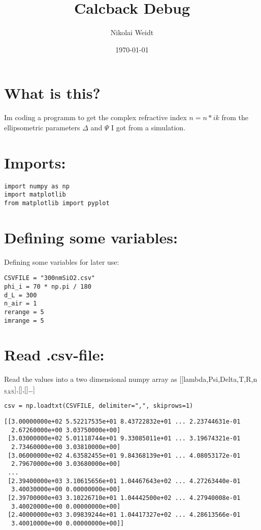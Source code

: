 \documentclass[11pt]{article}
\author{Nikolai Weidt}
\date{\today}
\title{Calcback Debug}
\begin{document}
\maketitle
\tableofcontents


\section{What is this?}
\label{sec:org780831c}
Im coding a programm to get the complex refractive index \(n = n * ik\) from the ellipsometric parameters \(\Delta\) and \(\Psi\) I got from a simulation.
\section{Imports:}
\label{sec:orgbf785b2}
\begin{verbatim}
import numpy as np
import matplotlib
from matplotlib import pyplot
\end{verbatim}

\section{Defining some variables:}
\label{sec:org04ef2e2}
Defining some variables for later use:

\begin{verbatim}
CSVFILE = "300nmSiO2.csv"
phi_i = 70 * np.pi / 180
d_L = 300
n_air = 1
rerange = 5
imrange = 5
\end{verbatim}

\section{Read .csv-file:}
\label{sec:org3476096}
Read the values into a two dimensional numpy array as [[lambda,Psi,Delta,T,R,n\(_{\text{S,k}}\)\(_{\text{S}}\)],[],[]\ldots{}]

\begin{verbatim}
csv = np.loadtxt(CSVFILE, delimiter=",", skiprows=1)
\end{verbatim}

\begin{verbatim}
[[3.00000000e+02 5.52217535e+01 8.43722832e+01 ... 2.23744631e-01
  2.67260000e+00 3.03750000e+00]
 [3.03000000e+02 5.01118744e+01 9.33085011e+01 ... 3.19674321e-01
  2.73460000e+00 3.03810000e+00]
 [3.06000000e+02 4.63582455e+01 9.84368139e+01 ... 4.08053172e-01
  2.79670000e+00 3.03680000e+00]
 ...
 [2.39400000e+03 3.10615656e+01 1.04467643e+02 ... 4.27263440e-01
  3.40030000e+00 0.00000000e+00]
 [2.39700000e+03 3.10226710e+01 1.04442500e+02 ... 4.27940008e-01
  3.40020000e+00 0.00000000e+00]
 [2.40000000e+03 3.09839244e+01 1.04417327e+02 ... 4.28613566e-01
  3.40010000e+00 0.00000000e+00]]
\end{verbatim}
\end{document}
